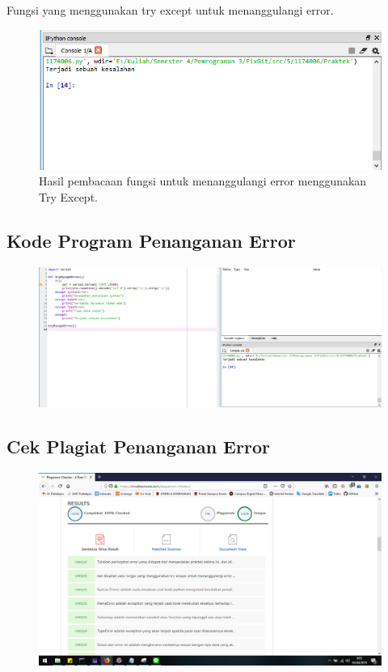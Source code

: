 \hfill \break
Fungsi yang menggunakan try except untuk menanggulangi error.



\begin{figure}[H]
	\includegraphics[width=12cm]{figures/5/1174086/Praktek/5.png}
	\centering
	\caption{Hasil pembacaan fungsi untuk menanggulangi error menggunakan Try Except.}
\end{figure}

\subsection{Kode Program Penanganan Error}
\begin{figure}[H]
	\includegraphics[width=12cm]{figures/5/1174086/Praktek/error.png}
	\centering
\end{figure}

\subsection{Cek Plagiat Penanganan Error}
\begin{figure}[H]
	\includegraphics[width=12cm]{figures/5/1174086/Praktek/plagiaterror.png}
	\centering
\end{figure}

